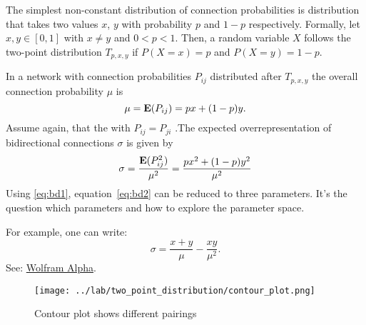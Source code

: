 
The simplest non-constant distribution of connection probabilities is distribution that takes two values $x$, $y$ with probability $p$ and $1-p$ respectively. Formally, let $x, y \in [0,1]$ with $x \neq y$  and $0 < p < 1$. Then, a random variable $X$ follows the two-point distribution  $T_{p,x,y}$  if $P(X=x)=p$ and $P(X=y) = 1-p$. 

In a network with connection probabilities $P_{ij}$ distributed after $T_{p,x,y}$ the overall connection probability $\mu$ is
\[
\mu = \operatorname{\mathbf{E}}(P_{ij}) = px + (1-p)y.
\]
Assume again, that the with $P_{ij} = P_{ji}$ .The expected overrepresentation of bidirectional connections $\sigma$ is given by
\begin{align}
  \sigma = \frac{\operatorname{\mathbf{E}}(P_{ij}^2)}{\mu^2} = \frac{p x^2 + (1-p) y^2}{\mu^2} \label{eq:bd2}
\end{align}
Using \eqref{eq:bd1}, equation~\eqref{eq:bd2} can be reduced to three parameters. It's the question which parameters and how to explore the parameter space.

For example, one can write:
\[
\sigma = \frac{x+y}{\mu} - \frac{xy}{\mu^2}.
\]
See: \href{https://www.wolframalpha.com/input/?i=Simplify[%28%28%28c-y%29%2F%28x-y%29%29*x^2%2B%281-%28%28c-y%29%2F%28x-y%29%29%29*y^2%29%2Fc^2]}{Wolfram Alpha}.

\begin{figure}[h!]
\centering
\texttt{[image: ../lab/two\_point\_distribution/contour\_plot.png]}
\caption{Contour plot shows different pairings}
\end{figure}



